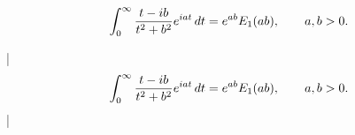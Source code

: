 

\bigskip


$$\int_0^{\infty}{t-ib\over t^2+b^2}e^{iat}\,dt=
  e^{ab}E_1(ab),\qquad a,b>0.$$

\bigskip

\respuestaS

|$$\int_0^{\infty}{t-ib\over t^2+b^2}e^{iat}\,dt=
 e^{ab}E_1(ab),\qquad a,b>0.$$|

\bye


